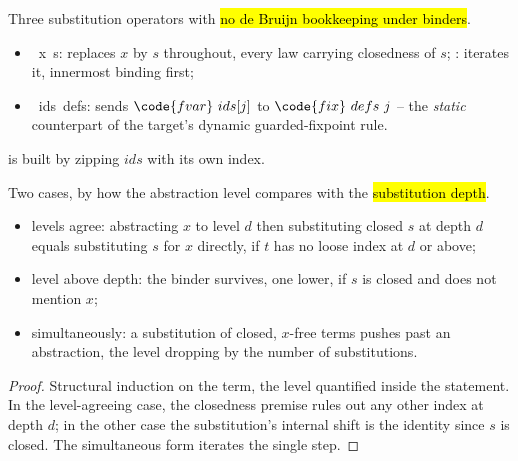 \begin{definition}
\label{def:substFVar}
\leanok
{}
 Three substitution operators with \hl{no de Bruijn bookkeeping under binders}.
\begin{itemize}
\item {}\ x\ s: replaces $x$ by $s$ throughout, every law carrying closedness of $s$;
: iterates it, innermost binding first;
\item {}\ ids\ defs: sends $\code{fvar}\ ids[j]$ to $\code{fix}\ defs\ j$ -- the
\emph{static} counterpart of the target's dynamic guarded-fixpoint rule.
\end{itemize}
  is built by zipping $ids$ with its own index.
\end{definition}

\begin{lemma}
\label{lem:subst_toBvar_self}
\leanok
{}
 Two cases, by how the abstraction level compares with the \hl{substitution depth}.
\begin{itemize}
\item levels agree: abstracting $x$ to level $d$ then substituting closed $s$ at depth $d$ equals
substituting $s$ for $x$ directly, if $t$ has no loose index at $d$ or above;
\item level above depth: the binder survives, one lower, if $s$ is closed and does not mention $x$;
\item simultaneously: a substitution of closed, $x$-free terms pushes past an abstraction, the level
dropping by the number of substitutions.
\end{itemize}
\end{lemma}
\begin{proof}
\leanok
{}
 Structural induction on the term, the level quantified inside the statement. In the
level-agreeing case, the closedness premise rules out any other index at depth $d$; in the other case
the substitution's internal shift is the identity since $s$ is closed. The simultaneous form iterates
the single step.
\end{proof}

